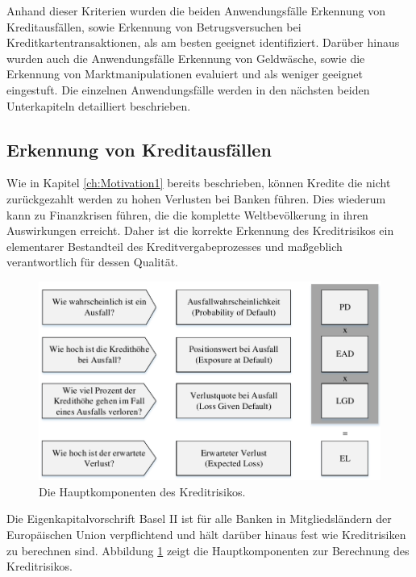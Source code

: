 Anhand dieser Kriterien wurden die beiden Anwendungsfälle Erkennung von Kreditausfällen, sowie Erkennung von Betrugsversuchen bei Kreditkartentransaktionen, als am besten geeignet identifiziert. Darüber hinaus wurden auch die Anwendungsfälle Erkennung von Geldwäsche, sowie die Erkennung von Marktmanipulationen evaluiert und als weniger geeignet eingestuft. Die einzelnen Anwendungsfälle werden in den nächsten beiden Unterkapiteln detailliert beschrieben.  

\subsection{Erkennung von Kreditausfällen}
\label{subsec:Kreditausfallen3}

Wie in Kapitel \ref{ch:Motivation1} bereits beschrieben, können Kredite die nicht zurückgezahlt werden zu hohen Verlusten bei Banken führen. Dies wiederum kann zu Finanzkrisen führen, die die komplette Weltbevölkerung in ihren Auswirkungen erreicht. Daher ist die korrekte Erkennung des Kreditrisikos ein elementarer Bestandteil des Kreditvergabeprozesses und maßgeblich verantwortlich für dessen Qualität. 

\begin{figure}[ht]
\centering
\includegraphics{images/creditriskdimensions.pdf}
\caption{Die Hauptkomponenten des Kreditrisikos.}
\label{fig:creditriskdimensions}
\end{figure}

Die Eigenkapitalvorschrift Basel II ist für alle Banken in Mitgliedsländern der Europäischen Union verpflichtend \cite{RE13} und hält darüber hinaus fest wie Kreditrisiken zu berechnen sind. Abbildung \ref{fig:creditriskdimensions} \cite{GK10} zeigt die Hauptkomponenten zur Berechnung des Kreditrisikos.    

